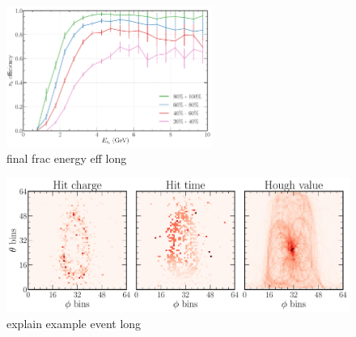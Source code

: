 \begin{figure} %
    \includegraphics[width=0.6\textwidth]{diagrams/7-cvn/chipsnet/final_frac_energy_eff.pdf}
    \caption[final frac energy eff short]
    {final frac energy eff long}
    \label{fig:final_frac_energy_eff}
\end{figure}

\begin{figure} %
    \includegraphics[width=\textwidth]{diagrams/7-cvn/chipsnet/explain_example_event.pdf}
    \caption[explain example event short]
    {explain example event long}
    \label{fig:explain_example_event}
\end{figure}

